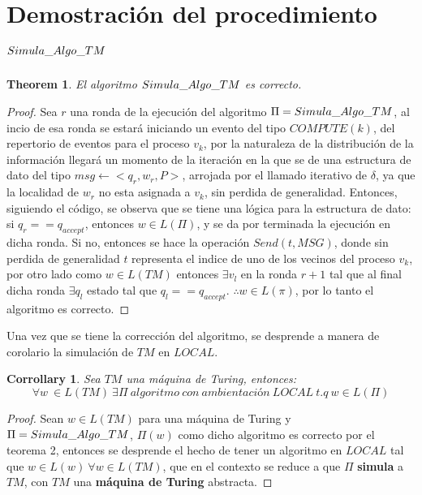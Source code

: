 \documentclass[10pt]{report}
\newtheorem{corrollary}{Corrollary}
\newtheorem{theorem}{Theorem}
\begin{document}
    \section{Demostración del procedimiento $Simula\char95Algo\char95TM$}\label{sec:demostración-del-procedimiento}
    \begin{theorem}
        El algoritmo $Simula\char95Algo\char95TM$ es correcto.
    \end{theorem}
    \begin{proof}
        Sea $r$ una ronda de la ejecución del algoritmo $\Pi=Simula\char95Algo\char95TM$,
        al incio de esa ronda se estará iniciando un evento del tipo $COMPUTE(k)$, del repertorio de eventos para el proceso
        $v_{k}$, por la naturaleza de la distribución de la información llegará un momento
        de la iteración en la que se de una estructura de dato del tipo $msg\gets <q_{r},w_{r},P>$, arrojada por el llamado iterativo de
        $\delta$, ya que la localidad de $w_{r}$ no esta asignada a $v_{k}$, sin perdida de generalidad.
        \hfill
        Entonces, siguiendo el código, se observa que se tiene una lógica para la estructura de dato:
        \hfill
        si $q_{r}==q_{accept}$, entonces $w\in L(\Pi)$, y se da por terminada la ejecución en dicha ronda.
        Si no, entonces se hace la operación $Send(t,MSG)$, donde sin perdida de generalidad $t$ representa el indice de uno de los vecinos
        del proceso $v_{k}$, por otro lado como $w\in L(TM)$ entonces $\exists v_{l}$ en la ronda $r+1$
        tal que al final dicha ronda $\exists q_{l}$ estado tal que $q_{l} == q_{accept}$.\newline
        $\therefore w\in L(\pi)$, por lo tanto el algoritmo es correcto.

    \end{proof}
    Una vez que se tiene la corrección del algoritmo, se desprende a manera de corolario la
    simulación de $TM$ en $LOCAL$.
    \begin{corrollary}
        Sea $TM$ una máquina de Turing, entonces:
        \begin{equation}
            \forall w \  \in L(TM) \ \exists \Pi \ algoritmo \ con\ ambientación \ LOCAL\ t.q \ w \in L(\Pi)
        \end{equation}
    \end{corrollary}

    \begin{proof}
        Sean $w\in L(TM)$ para una máquina de Turing y  $\Pi =Simula\char95Algo\char95TM$, $\Pi(w)$ como dicho algoritmo es correcto por el teorema 2,
        entonces se desprende el hecho de tener un algoritmo  en $LOCAL$ tal que $w\in L(w) \ \forall w\in L(TM)$,
        que en el contexto se reduce a que $\Pi$ \textbf{simula} a $TM$, con $TM$ una \textbf{máquina de Turing} abstracta.
    \end{proof}
\end{document}
